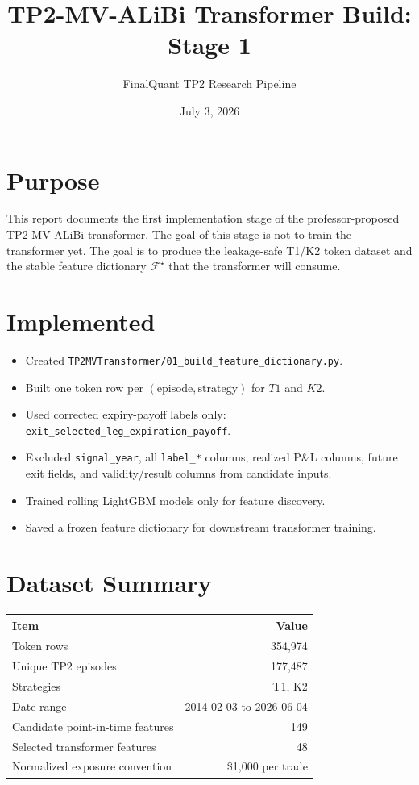 \documentclass[11pt]{article}
\title{TP2-MV-ALiBi Transformer Build: Stage 1}
\author{FinalQuant TP2 Research Pipeline}
\date{July 3, 2026}
\begin{document}
\maketitle

\section*{Purpose}

This report documents the first implementation stage of the professor-proposed
TP2-MV-ALiBi transformer. The goal of this stage is not to train the transformer
yet. The goal is to produce the leakage-safe T1/K2 token dataset and the stable
feature dictionary \( \mathcal F^\star \) that the transformer will consume.

\section*{Implemented}

\begin{itemize}
  \item Created \texttt{TP2MVTransformer/01\_build\_feature\_dictionary.py}.
  \item Built one token row per \((\mathrm{episode}, \mathrm{strategy})\) for \(T1\) and \(K2\).
  \item Used corrected expiry-payoff labels only: \texttt{exit\_selected\_leg\_expiration\_payoff}.
  \item Excluded \texttt{signal\_year}, all \texttt{label\_*} columns, realized P\&L columns, future exit fields, and validity/result columns from candidate inputs.
  \item Trained rolling LightGBM models only for feature discovery.
  \item Saved a frozen feature dictionary for downstream transformer training.
\end{itemize}

\section*{Dataset Summary}

\begin{center}
\begin{tabular}{lr}
\toprule
Item & Value \\
\midrule
Token rows & 354,974 \\
Unique TP2 episodes & 177,487 \\
Strategies & T1, K2 \\
Date range & 2014-02-03 to 2026-06-04 \\
Candidate point-in-time features & 149 \\
Selected transformer features & 48 \\
Normalized exposure convention & \$1,000 per trade \\
\bottomrule
\end{tabular}
\end{center}
\end{document}
